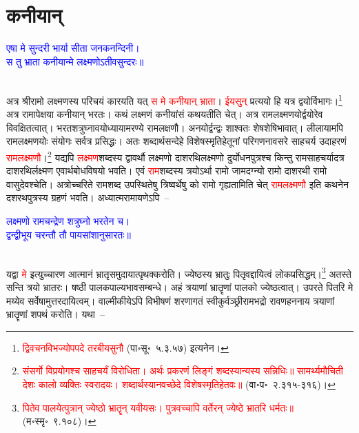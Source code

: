 \section[कनीयान्]{कनीयान्}
\centering\textcolor{blue}{एषा मे सुन्दरी भार्या सीता जनकनन्दिनी।\nopagebreak\\
स तु भ्राता कनीयान्मे लक्ष्मणोऽतीवसुन्दरः॥}\nopagebreak\\
\\
\begin{sloppypar}\justifying\noindent\hspace{10mm} अत्र श्रीरामो लक्ष्मणस्य परिचयं कारयति यत् \textcolor{red}{स मे कनीयान् भ्राता}। \textcolor{red}{ईयसुन्} प्रत्ययो हि यत्र द्वयोर्विभागः।\footnote{\textcolor{red}{द्विवचनविभज्योपपदे तरबीयसुनौ} (पा॰सू॰~५.३.५७) इत्यनेन।} अत्र रामापेक्षया कनीयान् भरतः। कथं लक्ष्मणं कनीयांसं कथयतीति चेत्। अत्र राम\-लक्ष्मणयोर्द्वयोरेव विवक्षितत्वात्। भरत\-शत्रुघ्नावयोध्यायामरण्ये राम\-लक्षणौ। अनयोर्द्वन्द्वः शाश्वतः शेष\-शेषि\-भावात्। लीलायामपि राम\-लक्ष्मणयोः संयोगः सर्वत्र प्रसिद्धः। अतः शब्दार्थ\-सन्देहे विशेष\-स्मृति\-हेतूनां परिगणनावसरे साहचर्य उदाहरणं \textcolor{red}{राम\-लक्ष्मणौ}।\footnote{\textcolor{red}{संसर्गो विप्रयोगश्च साहचर्यं विरोधिता। अर्थः प्रकरणं लिङ्गं शब्दस्यान्यस्य सन्निधिः॥ सामर्थ्यमौचिती देशः कालो व्यक्तिः स्वरादयः। शब्दार्थस्यानवच्छेदे विशेषस्मृतिहेतवः॥} (वा॰प॰~२.३१५-३१६)।} यद्यपि \textcolor{red}{लक्ष्मण}\-शब्दस्य द्वावर्थौ लक्ष्मणो दाशरथि\-लक्ष्मणो दुर्योधन\-पुत्रश्च किन्तु राम\-साहचर्यादत्र दाशरथिर्लक्ष्मण एवार्थ\-बोध\-विषयो भवति। एवं \textcolor{red}{राम}\-शब्दस्य त्रयोऽर्था रामो जामदग्न्यो रामो दाशरथी रामो वासुदेवश्चेति। अत्रोच्चरिते राम\-शब्द उपस्थितेषु त्रिष्वर्थेषु को रामो गृह्यतामिति चेत् \textcolor{red}{राम\-लक्ष्मणौ} इति कथनेन दशरथ\-पुत्रस्य ग्रहणं भवति। अध्यात्म\-रामायणेऽपि~– \end{sloppypar}
\centering\textcolor{blue}{लक्ष्मणो रामचन्द्रेण शत्रुघ्नो भरतेन च।\nopagebreak\\
द्वन्द्वीभूय चरन्तौ तौ पायसांशानुसारतः॥}\nopagebreak\\
\\
\begin{sloppypar}\justifying\noindent\hspace{10mm} यद्वा \textcolor{red}{मे} इत्युच्चारण आत्मानं भ्रातृ\-समुदायात्पृथक्करोति। ज्येष्ठस्य भ्रातुः पितृवद्दायित्वं लोक\-प्रसिद्धम्।\footnote{\textcolor{red}{पितेव पालयेत्पुत्रान् ज्येष्ठो भ्रातॄन् यवीयसः। पुत्रवच्चापि वर्तेरन् ज्येष्ठे भ्रातरि धर्मतः॥} (म॰स्मृ॰~९.१०८)।} अतस्ते सन्ति त्रयो भ्रातरः। षष्ठी पालक\-पाल्य\-भाव\-सम्बन्धे। अहं त्रयाणां भ्रातॄणां पालको ज्येष्ठत्वात्। उपरते पितरि मे मय्येव सर्वेषामुत्तर\-दायित्वम्। वाल्मीकीयेऽपि विभीषणं शरणागतं स्वीकुर्वञ्छ्रीरामभद्रो रावण\-हननाय त्रयाणां भ्रातॄणां शपथं करोति। यथा~–\end{sloppypar}
